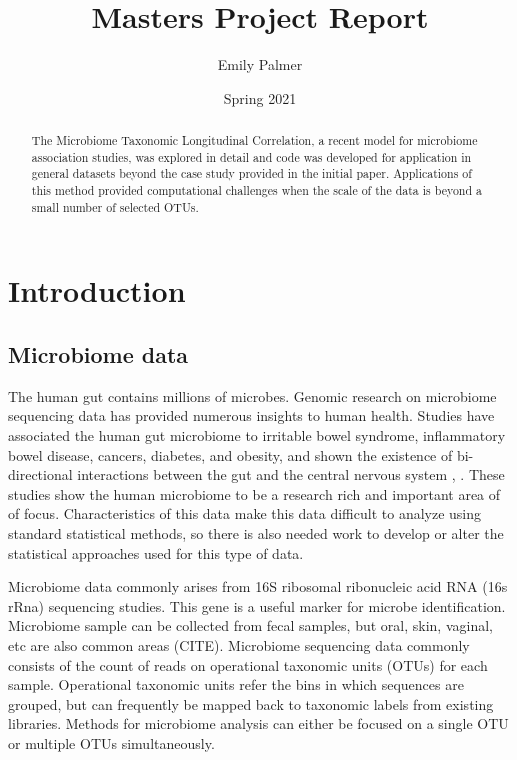 \documentclass[12pt]{article}
\title{Masters Project Report}
\author{Emily Palmer}
\date{Spring 2021}
\begin{document}
\maketitle

\begin{abstract}
  The Microbiome Taxonomic Longitudinal Correlation, a recent model for microbiome association studies, was explored in detail and code was developed for application in general datasets beyond the case study provided in the initial paper. Applications of this method provided computational challenges when the scale of the data is beyond a small number of selected OTUs.
\end{abstract}

\tableofcontents



\section{Introduction}

\subsection{Microbiome data}
The human gut contains millions of microbes. Genomic research on microbiome sequencing data has provided numerous insights to human health. Studies have associated the human gut microbiome to irritable bowel syndrome, inflammatory bowel disease, cancers, diabetes, and obesity, and shown the existence of bi-directional interactions  between the gut and the central nervous system \cite{kinross2008human}, \cite{mayer2015gut}. These studies show the human microbiome to be a research rich and important area of of focus. Characteristics of this data make this data difficult to analyze using standard statistical methods, so there is also needed work to develop or alter the statistical approaches used for this type of data.


Microbiome data commonly arises from 16S ribosomal ribonucleic acid RNA (16s rRna) sequencing studies. This gene is a useful marker for microbe identification. Microbiome sample can be collected from fecal samples, but oral, skin, vaginal, etc are also common areas (CITE). Microbiome sequencing data commonly consists of the count of reads on operational taxonomic units (OTUs) for each sample. Operational taxonomic units refer the bins in which sequences are grouped, but can frequently be mapped back to taxonomic labels from existing libraries. Methods for microbiome analysis can either be focused on a single OTU or multiple OTUs simultaneously.
\end{document}
